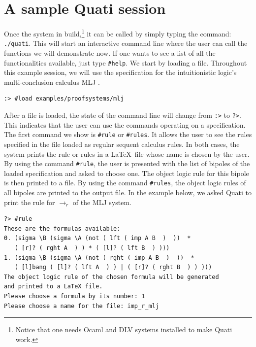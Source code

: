 \documentclass{llncs}
\begin{document}
\section{A sample Quati session}

Once the system in build,\footnote{Notice that one needs Ocaml and DLV systems installed to make
Quati work.} it can be called by simply typing the command:
\texttt{./quati}. This will start an interactive command line where the user can
call the functions we will demonstrate now. If one wants to see a list of all
the functionalities available, just type \texttt{\#help}. We start by loading a
file. Throughout this example session, we will use the specification for the
intuitionistic logic's multi-conclusion calculus MLJ \cite{maehara54nmj}.
%
\vspace{-1mm}

{\small
\begin{verbatim}
:> #load examples/proofsystems/mlj
\end{verbatim}
}

After a file is loaded, the state of the command line will change from
\texttt{:>} to \texttt{?>}. This indicates that the user can use the commands
operating on a specification. The first command we show is \texttt{\#rule} or
\texttt{\#rules}. It allows the user to see the rules specified in the file
loaded as regular sequent calculus rules. In both cases, the system prints the
rule or rules in a \LaTeX\ file whose name is chosen by the user. By using the
command \texttt{\#rule}, the user is presented with the list of bipoles of the
loaded specification and asked to choose one. The object logic rule for this
bipole is then printed to a file. By using the command \texttt{\#rules}, the
object logic rules of all bipoles are printed to the output file. In the example
below, we asked Quati to print the rule for $\rightarrow_r$ of the MLJ system.
\vspace{-1mm}

{\small
\begin{verbatim}
?> #rule
These are the formulas available: 
0. (sigma \B (sigma \A (not ( lft ( imp A B  )  ))  * 
   ( [r]? ( rght A  ) ) * ( [l]? ( lft B  ) )))
1. (sigma \B (sigma \A (not ( rght ( imp A B  )  ))  * 
   ( [l]bang ( [l]? ( lft A  ) ) | ( [r]? ( rght B  ) ) )))
The object logic rule of the chosen formula will be generated 
and printed to a LaTeX file.
Please choose a formula by its number: 1
Please choose a name for the file: imp_r_mlj
\end{verbatim}
}
\end{document}
